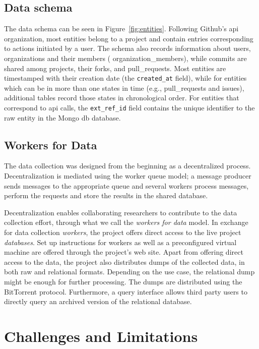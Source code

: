 \documentclass[conference,letter]{IEEEtran}
\begin{document}
\subsection*{Data schema}

The data schema can be seen in Figure~\ref{fig:entities}. Following Github's
{\sc api} organization, most entities belong to a {\sf project} and contain
entries corresponding to actions initiated by a {\sf user}. The schema also
records information about {\sf users}, organizations and their members ({\sf
organization\_members}), while {\sf commits} are shared among {\sf projects}, their
forks, and {\sf pull\_requests}.  Most entities are timestamped with their
creation date (the \texttt{created\_at} field), while for entities which can be
in more than one states in time (e.g.,  {\sf pull\_requests} and {\sf issues}),
additional tables record those states in chronological order.  
For entities that correspond to {\sc api} calls, the \texttt{ext\_ref\_id}
field contains the unique identifier to the raw entity in the Mongo{\sc
db} database.

\subsection*{Workers for Data}

The data collection was designed from the beginning as a decentralized process.
Decentralization is mediated using the worker queue model; a message producer
sends messages to the appropriate queue and several workers process messages,
perform the requests and store the results in the shared database.

Decentralization enables collaborating researchers to contribute to the data
collection effort, through what we call the \emph{workers for data} model.  In
exchange for data collection \emph{workers}, the project offers direct access to
the live project \emph{databases}. Set up instructions for workers as well as a
preconfigured virtual machine are offered through the project's web site. Apart
from offering direct access to the data, the project also distributes dumps of
the collected data, in both raw and relational formats. Depending on the use
case, the relational dump might be enough for further processing. The dumps are
distributed using the BitTorrent protocol. Furthermore, a query interface
allows third party users to directly query an archived version of the relational
database.

\section{Challenges and Limitations}
\end{document}
